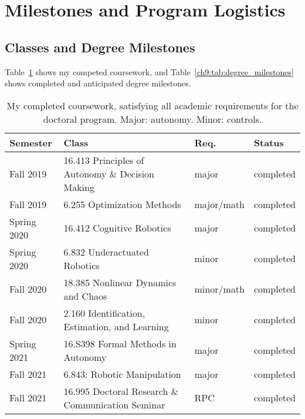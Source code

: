 
\section{Milestones and Program Logistics}

\subsection{Classes and Degree Milestones}

Table~\ref{ch9:tab:course_requirements} shows my competed coursework, and Table~\ref{ch9:tab:degree_milestones} shows completed and anticipated degree milestones.

\begin{table}[h]
\centering
\caption{My completed coursework, satisfying all academic requirements for the doctoral program. Major: autonomy. Minor: controls.}
\label{ch9:tab:course_requirements}
\begin{tabular}{llll}
Semester    & Class                                             & Req.       & Status    \\ \hline
Fall 2019   & 16.413 Principles of Autonomy \& Decision Making  & major      & completed \\
Fall 2019   & 6.255 Optimization Methods                        & major/math & completed \\
Spring 2020 & 16.412 Cognitive Robotics                         & major      & completed \\
Spring 2020 & 6.832 Underactuated Robotics                      & minor      & completed \\
Fall 2020   & 18.385 Nonlinear Dynamics and Chaos               & minor/math & completed \\
Fall 2020   & 2.160 Identification, Estimation, and Learning    & minor      & completed \\
Spring 2021 & 16.S398 Formal Methods in Autonomy                & major      & completed \\
Fall 2021   & 6.843: Robotic Manipulation                       & major      & completed \\
Fall 2021   & 16.995 Doctoral Research \& Communication Seminar & RPC        & completed
\end{tabular}
\end{table}


